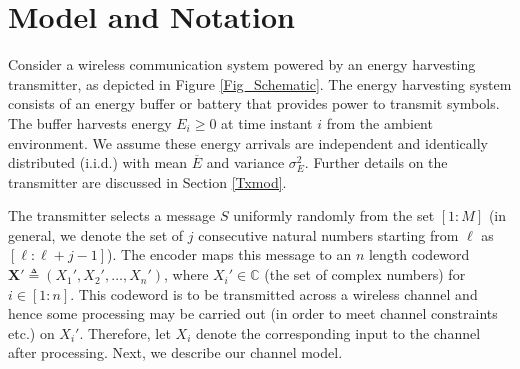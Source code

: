 \documentclass[conference]{IEEEtran}
\begin{document}
\section{Model and Notation}
Consider a wireless communication system powered by an energy harvesting transmitter, as depicted in Figure \ref{Fig_Schematic}. The energy harvesting system consists of an energy buffer or battery that provides power to transmit symbols. The buffer harvests energy $E_i\geq 0$ at time instant $i$ from the ambient environment. We assume these energy arrivals are independent and identically distributed (i.i.d.) with mean $\overline{E}$ and variance $\sigma_E^2$. Further details on the transmitter are discussed in Section \ref{Txmod}.

The transmitter selects a message $S$ uniformly randomly from the set $[1:M]$ (in general, we denote the set of $j$ consecutive natural numbers starting from $\ell$  as $[\ell:\ell+j-1]$). The encoder maps this message to an $n$ length codeword $\mathbf{X}'\triangleq \left(X_{1}',X_{2}',\dots, X_{n}'\right)$, where $X_{i}'\in\mathbb{C}$ (the set of complex numbers) for $i\in[1:n]$. This codeword is to be transmitted across a wireless channel and hence some processing may be carried out (in order to meet channel constraints etc.) on $X_i'$. Therefore, let $X_i$ denote the corresponding input to the channel after processing. Next, we describe our channel model. 
\end{document}
